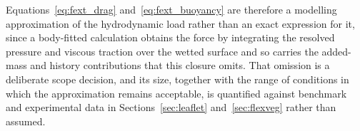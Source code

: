 \noindent
Equations~\eqref{eq:fext_drag} and~\eqref{eq:fext_buoyancy} are therefore a modelling approximation of the hydrodynamic load rather than an exact expression for it, since a body-fitted calculation obtains the force by integrating the resolved pressure and viscous traction over the wetted surface and so carries the added-mass and history contributions that this closure omits. That omission is a deliberate scope decision, and its size, together with the range of conditions in which the approximation remains acceptable, is quantified against benchmark and experimental data in Sections~\ref{sec:leaflet} and~\ref{sec:flexveg} rather than assumed.
